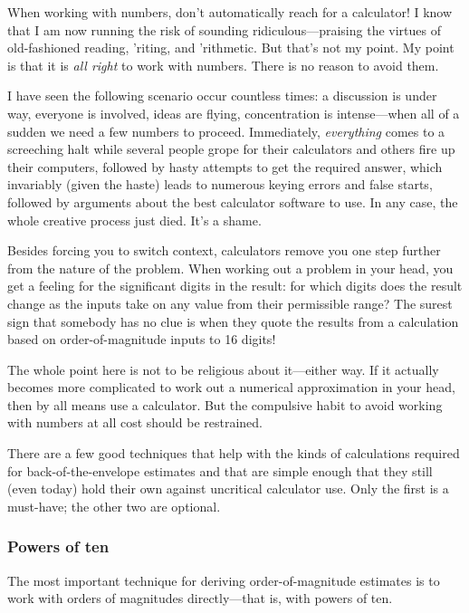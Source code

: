 When working with numbers, don't automatically reach for a calculator!
I know that I am now running the risk of sounding ridiculous---praising
the virtues of old-fashioned reading, 'riting, and 'rithmetic. But
that's not my point. My point is that it is \emph{all right} to work
with numbers. There is no reason to avoid them.
    
I have seen the following scenario occur countless times: a discussion
is under way, everyone is involved, ideas are flying, concentration is
intense---when all of a sudden we need a few numbers to proceed.
Immediately, \emph{everything} comes to a screeching halt while
several people grope for their calculators and others fire up their
computers, followed by hasty attempts to get the required answer,
which invariably (given the haste) leads to numerous keying errors and
false starts, followed by arguments about the best calculator software
to use. In any case, the whole creative process just died. It's a
shame.
    
Besides forcing you to switch context, calculators remove you one step
further from the nature of the problem. When working out a problem in
your head, you get a feeling for the significant digits in the result:
for which digits does the result change as the inputs take on any
value from their permissible range? The surest sign that somebody has
no clue is when they quote the results from a calculation based on
order-of-magnitude inputs to 16 digits!
    
The whole point here is not to be religious about it---either way.  If
it actually becomes more complicated to work out a numerical
approximation in your head, then by all means use a calculator.  But
the compulsive habit to avoid working with numbers at all cost should
be restrained.
    
There are a few good techniques that help with the kinds of
calculations required for back-of-the-envelope estimates and that are
simple enough that they still (even today) hold their own against
uncritical calculator use. Only the first is a must-have; the other
two are optional.

\subsubsection{Powers of ten}


The most important technique for deriving order-of-magnitude  estimates
is to work with orders of magnitudes directly---that is, with powers of
ten.
    
